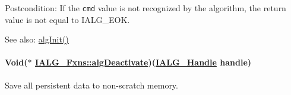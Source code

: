 \begin{Desc}
\item[Postcondition:]If the {\tt cmd} value is not recognized by the algorithm, the return value is not equal to IALG\_\-EOK.\end{Desc}
\begin{Desc}
\item[See also:]\hyperlink{struct_i_a_l_g___fxns_94eca7c58cceb112eccd970a6cf3f569}{alg\-Init()} \end{Desc}
\hypertarget{struct_i_a_l_g___fxns_10f29860ab8b3beab69b0f0128c3d969}{
\paragraph[algDeactivate]{\setlength{\rightskip}{0pt plus 5cm}Void($\ast$ \hyperlink{struct_i_a_l_g___fxns_10f29860ab8b3beab69b0f0128c3d969}{IALG\_\-Fxns::alg\-Deactivate})(\hyperlink{struct_i_a_l_g___obj}{IALG\_\-Handle} handle)}\hfill}
\label{struct_i_a_l_g___fxns_10f29860ab8b3beab69b0f0128c3d969}


Save all persistent data to non-scratch memory. 

